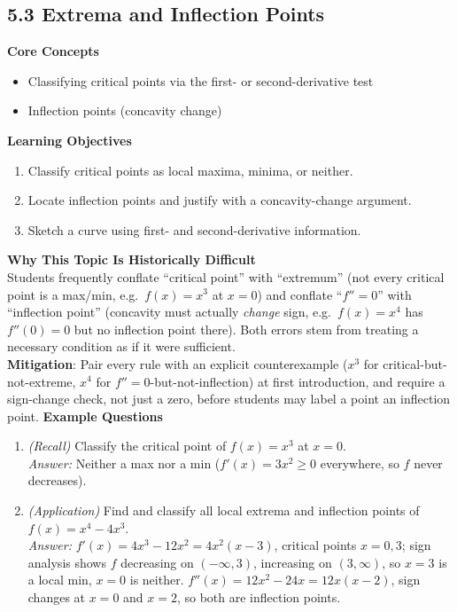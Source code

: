 \documentclass[11pt]{article}
\begin{document}
\subsection{5.3 Extrema and Inflection Points}
\textbf{Core Concepts}
\begin{itemize}
\item Classifying critical points via the first- or second-derivative test
\item Inflection points (concavity change)
\end{itemize}
\textbf{Learning Objectives}
\begin{enumerate}
\item Classify critical points as local maxima, minima, or neither.
\item Locate inflection points and justify with a concavity-change argument.
\item Sketch a curve using first- and second-derivative information.
\end{enumerate}
\textbf{Why This Topic Is Historically Difficult} \\
Students frequently conflate ``critical point'' with ``extremum'' (not every critical point is a max/min, e.g.\ $f(x)=x^3$ at $x=0$) and conflate ``$f''=0$'' with ``inflection point'' (concavity must actually \emph{change} sign, e.g.\ $f(x)=x^4$ has $f''(0)=0$ but no inflection point there). Both errors stem from treating a necessary condition as if it were sufficient. \\
\textbf{Mitigation}: Pair every rule with an explicit counterexample ($x^3$ for critical-but-not-extreme, $x^4$ for $f''=0$-but-not-inflection) at first introduction, and require a sign-change check, not just a zero, before students may label a point an inflection point.
\textbf{Example Questions}
\begin{enumerate}
\item \emph{(Recall)} Classify the critical point of $f(x)=x^3$ at $x=0$. \\
\textit{Answer:} Neither a max nor a min ($f'(x)=3x^2\ge0$ everywhere, so $f$ never decreases).
\item \emph{(Application)} Find and classify all local extrema and inflection points of $f(x)=x^4-4x^3$. \\
\textit{Answer:} $f'(x)=4x^3-12x^2=4x^2(x-3)$, critical points $x=0,3$; sign analysis shows $f$ decreasing on $(-\infty,3)$, increasing on $(3,\infty)$, so $x=3$ is a local min, $x=0$ is neither. $f''(x)=12x^2-24x=12x(x-2)$, sign changes at $x=0$ and $x=2$, so both are inflection points.
\end{enumerate}
\end{document}
